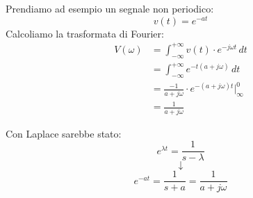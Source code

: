 \documentclass[a4paper]{article}
\begin{document}
\begin{example}
  Prendiamo ad esempio un segnale non periodico:
  \[
    v(t) = e^{-at}
  \] 
  Calcoliamo la trasformata di Fourier:
  \[
    \begin{aligned}
      V(\omega) &= \int_{-\infty}^{+\infty} v(t) \cdot e^{-j \omega t} \, dt\\
                &= \int_{-\infty}^{+\infty} e^{-t (a+j \omega)} \, dt\\
                &= \frac{-1}{a + j \omega} \cdot e^{-(a+j \omega)t} \Big|_{\infty}^{0}\\
                &= \frac{1}{a + j \omega}
    \end{aligned}
  \] 

  \vspace{1em}
  \noindent
  Con Laplace sarebbe stato:
  \[
    e^{\lambda t} = \frac{1}{s - \lambda}
  \] 
  \[
  \downarrow
  \] 
  \[
    e^{-at} = \frac{1}{s + a} = \frac{1}{a + j \omega}
  \] 
\end{example}
\end{document}

